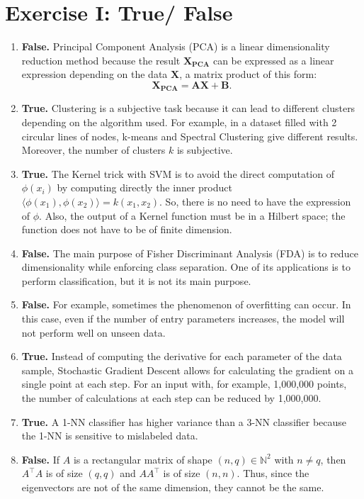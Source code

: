 \section{Exercise I: True/ False}

\begin{enumerate}[label=\arabic*.]
    \item \textbf{False.} Principal Component Analysis (PCA) is a linear dimensionality reduction method because the result $\mathbf{X_{PCA}}$ can be expressed as a linear expression depending on the data $\mathbf{X}$, a matrix product of this form:
    \[
        \mathbf{X_{PCA}} = \mathbf{A}\mathbf{X} + \mathbf{B}.
    \]
    \item \textbf{True.} Clustering is a subjective task because it can lead to different clusters depending on the algorithm used. For example, in a dataset filled with 2 circular lines of nodes, k-means and Spectral Clustering give different results. Moreover, the number of clusters $k$ is subjective.
    \item \textbf{True.} The Kernel trick with SVM is to avoid the direct computation of $\phi(x_i)$ by computing directly the inner product $\langle \phi(x_1), \phi(x_2) \rangle = k(x_1, x_2)$. So, there is no need to have the expression of $\phi$. Also, the output of a Kernel function must be in a Hilbert space; the function does not have to be of finite dimension.
    \item \textbf{False.} The main purpose of Fisher Discriminant Analysis (FDA) is to reduce dimensionality while enforcing class separation. One of its applications is to perform classification, but it is not its main purpose.
    \item \textbf{False.} For example, sometimes the phenomenon of overfitting can occur. In this case, even if the number of entry parameters increases, the model will not perform well on unseen data.
    \item \textbf{True.} Instead of computing the derivative for each parameter of the data sample, Stochastic Gradient Descent allows for calculating the gradient on a single point at each step. For an input with, for example, 1,000,000 points, the number of calculations at each step can be reduced by 1,000,000.
    \item \textbf{True.} A 1-NN classifier has higher variance than a 3-NN classifier because the 1-NN is sensitive to mislabeled data.
    \item \textbf{False.} If $A$ is a rectangular matrix of shape $(n, q) \in \mathbb{N}^2$ with $n \neq q$, then $A^{\intercal}A$ is of size $(q, q)$ and $AA^{\intercal}$ is of size $(n, n)$. Thus, since the eigenvectors are not of the same dimension, they cannot be the same.

\end{enumerate}

